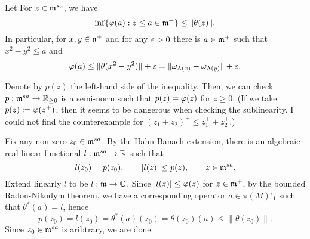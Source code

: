 \documentclass{../../../small}
\begin{document}
\begin{lem}
Let 
For $z\in\mathfrak{m}^{sa}$, we have
\[\inf\{\varphi(a):z\le a\in\mathfrak{m}^+\}\le\|\theta(z)\|.\]
In particular, for $x,y\in\mathfrak{n}^+$ and for any $\varepsilon>0$ there is $a\in\mathfrak{m}^+$ such that $x^2-y^2\le a$ and
\[\varphi(a)\le\|\theta(x^2-y^2)\|+\varepsilon=\|\omega_{\Lambda(x)}-\omega_{\Lambda(y)}\|+\varepsilon.\]
\end{lem}
\begin{pf}
Denote by $p(z)$ the left-hand side of the inequality.
Then, we can check $p:\mathfrak{m}^{sa}\to\mathbb{R}_{\ge0}$ is a semi-norm such that $p(z)=\varphi(z)$ for $z\ge0$.
(If we take $p(z):=\varphi(z^+)$, then it seems to be dangerous when checking the sublinearity. I could not find the counterexample for $(z_1+z_2)^+\le z_1^++z_2^+$.)

Fix any non-zero $z_0\in\mathfrak{m}^{sa}$.
By the Hahn-Banach extension, there is an algebraic real linear functional $l:\mathfrak{m}^{sa}\to\mathbb{R}$ such that
\[l(z_0)=p(z_0),\qquad |l(z)|\le p(z),\qquad z\in\mathfrak{m}^{sa}.\]
Extend linearly $l$ to be $l:\mathfrak{m}\to\mathbb{C}$.
Since $|l(z)|\le\varphi(z)$ for $z\in\mathfrak{m}^+$, by the bounded Radon-Nikodym theorem, we have a corresponding operator $a\in\pi(M)'_1$ such that $\theta^*(a)=l$, hence
\[p(z_0)=l(z_0)=\theta^*(a)(z_0)=\theta(z_0)(a)\le\|\theta(z_0)\|.\]
Since $z_0\in\mathfrak{m}^{sa}$ is aribtrary, we are done.
\end{pf}
\end{document}
